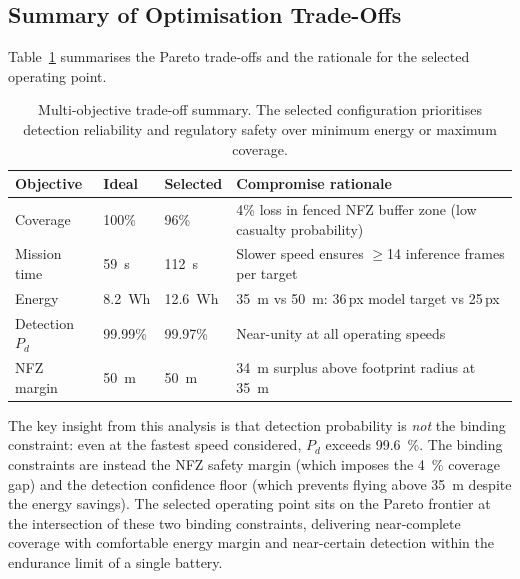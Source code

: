 \subsection{Summary of Optimisation Trade-Offs}\label{sec:opt-summary-old}

Table~\ref{tab:pareto-summary-old} summarises the Pareto trade-offs and the rationale for the selected operating point.

\begin{table}[ht]
  \centering\compactTable
  \caption{Multi-objective trade-off summary. The selected configuration prioritises detection reliability and regulatory safety over minimum energy or maximum coverage.}\label{tab:pareto-summary-old}
  \begin{tabularx}{\linewidth}{@{}l l l X@{}}
    \toprule
    \textbf{Objective} & \textbf{Ideal} & \textbf{Selected} & \textbf{Compromise rationale} \\
    \midrule
    Coverage        & 100\%          & 96\%         & 4\% loss in fenced NFZ buffer zone (low casualty probability) \\
    Mission time    & \SI{59}{\second}  & \SI{112}{\second} & Slower speed ensures $\geq$14 inference frames per target \\
    Energy          & \SI{8.2}{Wh}  & \SI{12.6}{Wh} & \SI{35}{\metre} vs \SI{50}{\metre}: 36\,px model target vs 25\,px \\
    Detection $P_d$ & 99.99\%        & 99.97\%      & Near-unity at all operating speeds \\
    NFZ margin      & \SI{50}{\metre}   & \SI{50}{\metre}  & \SI{34}{\metre} surplus above footprint radius at \SI{35}{\metre} \\
    \bottomrule
  \end{tabularx}
\end{table}

The key insight from this analysis is that detection probability is \emph{not} the binding constraint: even at the fastest speed considered, $P_d$ exceeds \SI{99.6}{\percent}. The binding constraints are instead the NFZ safety margin (which imposes the \SI{4}{\percent} coverage gap) and the detection confidence floor (which prevents flying above \SI{35}{\metre} despite the energy savings). The selected operating point sits on the Pareto frontier at the intersection of these two binding constraints, delivering near-complete coverage with comfortable energy margin and near-certain detection within the endurance limit of a single battery.
